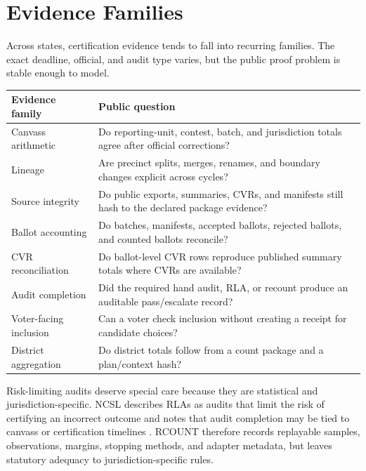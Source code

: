 \section{Evidence Families}

Across states, certification evidence tends to fall into recurring families.
The exact deadline, official, and audit type varies, but the public proof
problem is stable enough to model.

\begin{center}
\small
\begin{tabularx}{\textwidth}{lX}
\toprule
Evidence family & Public question \\
\midrule
Canvass arithmetic & Do reporting-unit, contest, batch, and jurisdiction totals agree after official corrections? \\
Lineage & Are precinct splits, merges, renames, and boundary changes explicit across cycles? \\
Source integrity & Do public exports, summaries, CVRs, and manifests still hash to the declared package evidence? \\
Ballot accounting & Do batches, manifests, accepted ballots, rejected ballots, and counted ballots reconcile? \\
CVR reconciliation & Do ballot-level CVR rows reproduce published summary totals where CVRs are available? \\
Audit completion & Did the required hand audit, RLA, or recount produce an auditable pass/escalate record? \\
Voter-facing inclusion & Can a voter check inclusion without creating a receipt for candidate choices? \\
District aggregation & Do district totals follow from a count package and a plan/context hash? \\
\bottomrule
\end{tabularx}
\end{center}

Risk-limiting audits deserve special care because they are statistical and
jurisdiction-specific. NCSL describes RLAs as audits that limit the risk of
certifying an incorrect outcome and notes that audit completion may be tied to
canvass or certification timelines \citep{ncsl-post-election-audits}. RCOUNT
therefore records replayable samples, observations, margins, stopping methods,
and adapter metadata, but leaves statutory adequacy to jurisdiction-specific
rules.
